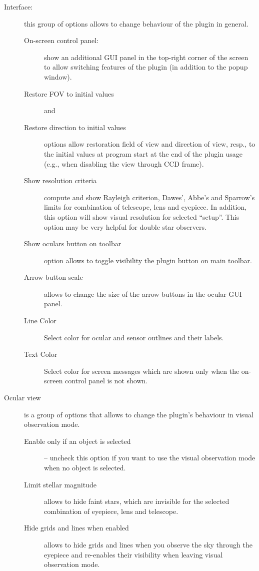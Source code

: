 \begin{description}
\item[Interface:] this group of options allows to change behaviour of the plugin in general.
 \begin{description}
   \item[On-screen control panel:] show an additional GUI panel in the top-right corner of the screen to allow switching features of the plugin (in addition to the popup window).
   \item[Restore FOV to initial values] and
   \item[Restore direction to initial values] options allow restoration field of view and direction of view, resp., 
         to the initial values at program start at the end of the plugin usage (e.g., when disabling the view through CCD frame).
   \item[Show resolution criteria] compute and show Rayleigh criterion, Dawes', Abbe's and Sparrow's limits for combination of telescope, lens and eyepiece.
         In addition, this option will show visual resolution for selected ``setup''. This option may be very helpful for double star observers.
   \item[Show oculars button on toolbar] option allows to toggle visibility the plugin button on main toolbar. 
   \item[Arrow button scale] allows to change the size of the arrow buttons in the ocular GUI panel. 
   \item[Line Color] Select  color for ocular and sensor outlines and their labels.
   \item[Text Color] Select  color for screen messages which are shown only when the on-screen control panel is not shown.
 \end{description}
\item[Ocular view] is a group of options that allows to change the plugin's behaviour in visual observation mode.
 \begin{description}
   \item[Enable only if an object is selected] -- uncheck this option if you want to use the visual observation mode when no object is selected.
   \item[Limit stellar magnitude] allows to hide faint stars, which are invisible for the selected combination of eyepiece, lens and telescope.
   \item[Hide grids and lines when enabled] allows to hide grids and lines when you observe the sky through the eyepiece and re-enables their visibility when leaving visual observation mode.

\end{description}
\end{description}
